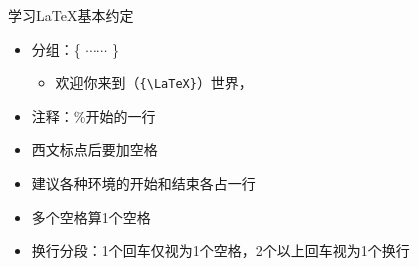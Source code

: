 \documentclass[fontset = none, xcolor=svgnames, t, aspectratio=169]{ctexbeamer}
\begin{document}

\begin{frame}[t,fragile]{学习\LaTeX}{基本约定}
  \stretchon
  \begin{itemize}
  \item 分组：\{ $\cdots\cdots$ \}
    \begin{itemize}
    \item 欢迎你来到{\latex}（\verb|{\LaTeX}|）世界，
    \end{itemize}
  \item 注释：\%开始的一行
  \item 西文标点后要加空格
  \item 建议各种环境的开始和结束各占一行
  \item 多个空格算1个空格
  \item \alert{换行分段}：1个回车仅视为1个空格，2个以上回车视为1个换行
  \end{itemize}
  \stretchoff
\end{frame}
\end{document}

